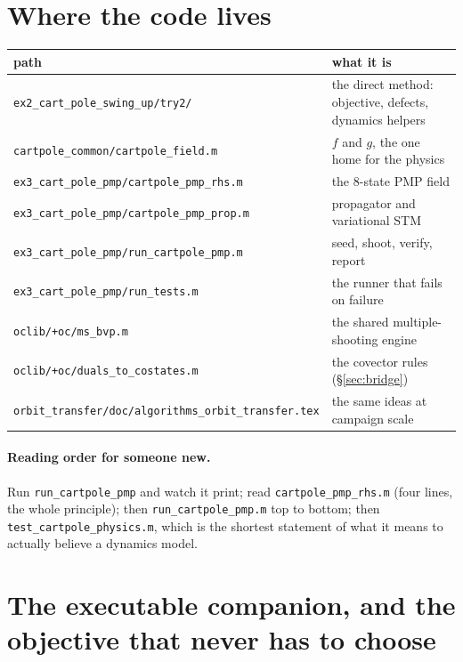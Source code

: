 \documentclass[11pt]{article}
\newcommand{\file}[1]{\texttt{#1}}
\begin{document}
\section{Where the code lives}

\begin{center}
\begin{tabular}{ll}
\toprule
\textbf{path} & \textbf{what it is}\\
\midrule
\file{ex2\_cart\_pole\_swing\_up/try2/} & the direct method: objective, defects, dynamics helpers\\
\file{cartpole\_common/cartpole\_field.m} & $f$ and $g$, the one home for the physics\\
\file{ex3\_cart\_pole\_pmp/cartpole\_pmp\_rhs.m} & the 8-state PMP field\\
\file{ex3\_cart\_pole\_pmp/cartpole\_pmp\_prop.m} & propagator and variational STM\\
\file{ex3\_cart\_pole\_pmp/run\_cartpole\_pmp.m} & seed, shoot, verify, report\\
\file{ex3\_cart\_pole\_pmp/run\_tests.m} & the runner that fails on failure\\
\file{oclib/+oc/ms\_bvp.m} & the shared multiple-shooting engine\\
\file{oclib/+oc/duals\_to\_costates.m} & the covector rules (\S\ref{sec:bridge})\\
\file{orbit\_transfer/doc/algorithms\_orbit\_transfer.tex} & the same ideas at campaign scale\\
\bottomrule
\end{tabular}
\end{center}

\paragraph{Reading order for someone new.} Run \file{run\_cartpole\_pmp} and
watch it print; read \file{cartpole\_pmp\_rhs.m} (four lines, the whole
principle); then \file{run\_cartpole\_pmp.m} top to bottom; then
\file{test\_cartpole\_physics.m}, which is the shortest statement of what it
means to actually believe a dynamics model.

\section{The executable companion, and the objective that never has to choose}\label{sec:companion}
\end{document}

